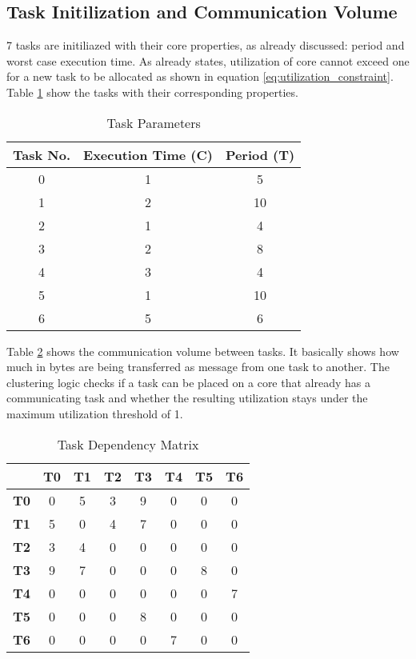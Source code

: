\documentclass[conference]{IEEEtran}
\begin{document}
\subsection{Task Initilization and Communication Volume}
\label{subsec: initialization}
7 tasks are initiliazed with their core properties, as already discussed: period and worst case execution time. As already states, utilization of core cannot exceed one for a new task to be allocated as shown in equation \ref{eq:utilization_constraint}. Table \ref{tab:task_parameters} show the tasks with their corresponding properties. 

\begin{table}[htbp]
\centering
\label{tab:task_parameters}
\begin{tabular}{|c|c|c|}
\hline
\textbf{Task No.} & \textbf{Execution Time (C)} & \textbf{Period (T)} \\
\hline
0 & 1 & 5 \\
1 & 2 & 10 \\
2 & 1 & 4 \\
3 & 2 & 8 \\
4 & 3 & 4 \\
5 & 1 & 10 \\
6 & 5 & 6 \\
\hline
\end{tabular}
\vspace{0.5em}
\caption{Task Parameters}
\end{table}

Table \ref{tab:task_dependency_matrix} shows the communication volume between tasks. It basically shows how much in bytes are being transferred as message from one task to another. The clustering logic checks if a task can be placed on a core that already has a communicating task and whether the resulting utilization stays under the maximum utilization threshold of 1.


\begin{table}[htbp]
\centering
\label{tab:task_dependency_matrix}
\setlength{\tabcolsep}{2pt} %
\renewcommand{\arraystretch}{2} %
\begin{tabular}{|c|c|c|c|c|c|c|c|}
\hline
 & \textbf{T0} & \textbf{T1} & \textbf{T2} & \textbf{T3} & \textbf{T4} & \textbf{T5} & \textbf{T6} \\
\hline
\textbf{T0} & 0 & 5 & 3 & 9 & 0 & 0 & 0 \\
\textbf{T1} & 5 & 0 & 4 & 7 & 0 & 0 & 0 \\
\textbf{T2} & 3 & 4 & 0 & 0 & 0 & 0 & 0 \\
\textbf{T3} & 9 & 7 & 0 & 0 & 0 & 8 & 0 \\
\textbf{T4} & 0 & 0 & 0 & 0 & 0 & 0 & 7 \\
\textbf{T5} & 0 & 0 & 0 & 8 & 0 & 0 & 0 \\
\textbf{T6} & 0 & 0 & 0 & 0 & 7 & 0 & 0 \\
\hline
\end{tabular}
\vspace{0.5em}
\caption{Task Dependency Matrix}
\end{table}
\end{document}
